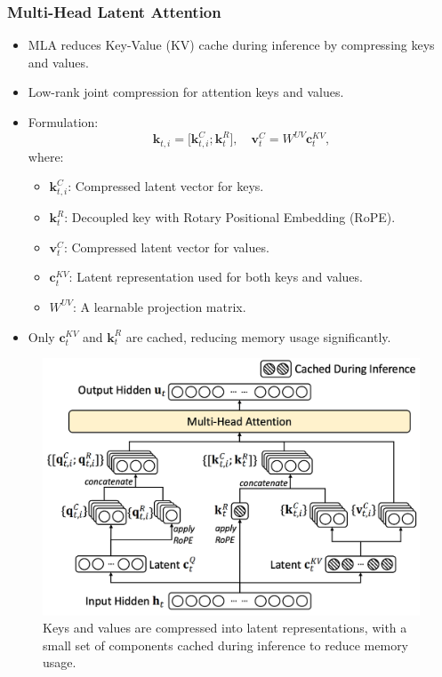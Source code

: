 \documentclass{beamer}
\begin{document}
\begin{frame}
    \frametitle{Multi-Head Latent Attention}
    \begin{itemize}
        \item MLA reduces Key-Value (KV) cache during inference by compressing keys and values.
        \item Low-rank joint compression for attention keys and values.
        \item Formulation:
              \begin{equation*}
                  \mathbf{k}_{t,i}=\bigl[\mathbf{k}_{t,i}^C;\mathbf{k}_t^R\bigr],\quad\mathbf{v}_t^C=W^{UV}\mathbf{c}_t^{KV},
              \end{equation*}
              where:
              \begin{itemize}
                  \item $\mathbf{k}_{t,i}^C$: Compressed latent vector for keys.
                  \item $\mathbf{k}_t^R$: Decoupled key with Rotary Positional Embedding (RoPE).
                  \item $\mathbf{v}_t^C$: Compressed latent vector for values.
                  \item $\mathbf{c}_t^{KV}$: Latent representation used for both keys and values.
                  \item $W^{UV}$: A learnable projection matrix.
              \end{itemize}
        \item Only $\mathbf{c}_t^{KV}$ and $\mathbf{k}_t^R$ are cached, reducing memory usage significantly.
    \end{itemize}
\end{frame}

\begin{frame}
    \begin{figure}[htbp]
        \centering
        \includegraphics[scale=0.22031]{attachments/multi-head-latent-attention.png}\caption{Keys and values are compressed into latent representations, with a small set of components cached during inference to reduce memory usage.}
    \end{figure}
\end{frame}
\end{document}

